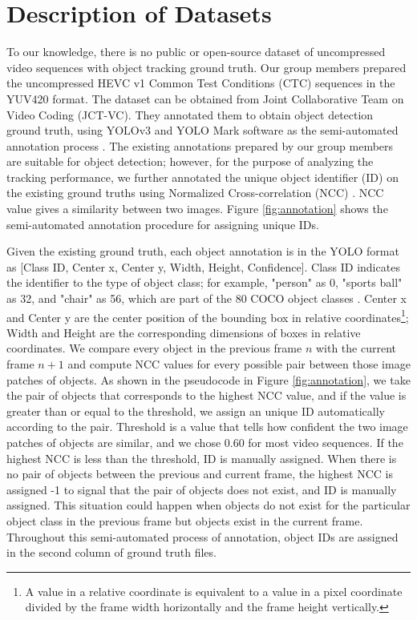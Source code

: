 \section{Description of Datasets}
\label{sec:methods/section_a}

To our knowledge, there is no public or open-source dataset of uncompressed video sequences with object tracking ground truth. Our group members prepared the uncompressed HEVC v1 Common Test Conditions (CTC) sequences \cite{bossen_common_2013} in the YUV420 format. The dataset can be obtained from Joint Collaborative Team on Video Coding (JCT-VC). They annotated them to obtain object detection ground truth, using YOLOv3 \cite{redmon_yolov3_2018} and YOLO Mark software \cite{alexey_alexeyabyolo_mark_2021} as the semi-automated annotation process \cite{choi_dataset_2021}. The existing annotations prepared by our group members are suitable for object detection; however, for the purpose of analyzing the tracking performance, we further annotated the unique object identifier (ID) on the existing ground truths using Normalized Cross-correlation (NCC) \cite{zhao_image_2006}. NCC value gives a similarity between two images. Figure \ref{fig:annotation} shows the semi-automated annotation procedure for assigning unique IDs.

Given the existing ground truth, each object annotation is in the YOLO format as [Class ID, Center x, Center y, Width, Height, Confidence]. Class ID indicates the identifier to the type of object class; for example, "person" as 0, "sports ball" as 32, and "chair" as 56, which are part of the 80 COCO object classes \cite{lin_microsoft_2014}. Center x and Center y are the center position of the bounding box in relative coordinates\footnote{A value in a relative coordinate is equivalent to a value in a pixel coordinate divided by the frame width horizontally and the frame height vertically.}; Width and Height are the corresponding dimensions of boxes in relative coordinates. We compare every object in the previous frame $n$ with the current frame $n+1$ and compute NCC values for every possible pair between those image patches of objects. As shown in the pseudocode in Figure \ref{fig:annotation}, we take the pair of objects that corresponds to the highest NCC value, and if the value is greater than or equal to the threshold, we assign an unique ID automatically according to the pair. Threshold is a value that tells how confident the two image patches of objects are similar, and we chose 0.60 for most video sequences. If the highest NCC is less than the threshold, ID is manually assigned. When there is no pair of objects between the previous and current frame, the highest NCC is assigned -1 to signal that the pair of objects does not exist, and ID is manually assigned. This situation could happen when objects do not exist for the particular object class in the previous frame but objects exist in the current frame. Throughout this semi-automated process of annotation, object IDs are assigned in the second column of ground truth files.
